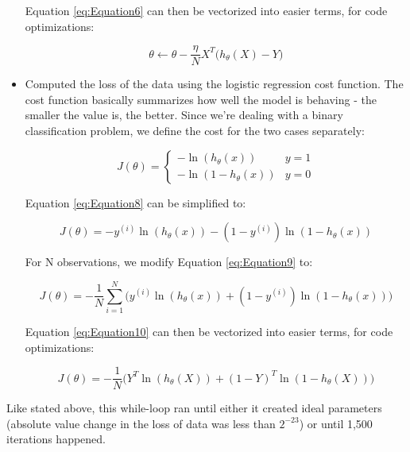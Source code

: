 \begin{itemize}
    Equation \eqref{eq:Equation6} can then be vectorized into easier terms, for code optimizations:

    \begin{equation}
        \label{eq:Equation7}
        \theta \leftarrow \theta - \dfrac{\eta}{N}X^{T}\Big(h_{\theta}(X) - Y\Big)
    \end{equation}

    \item Computed the loss of the data using the logistic regression cost function. The cost function basically summarizes how well the model is behaving - the smaller the value is, the better. Since we’re dealing with a binary classification problem, we define the cost for the two cases separately:

    \begin{equation}
        \label{eq:Equation8}
        J(\theta) =
        \begin{cases}
            -\ln(h_{\theta}(x)) & y = 1\\
            -\ln(1 - h_{\theta}(x)) & y = 0
        \end{cases}
    \end{equation}

    Equation \eqref{eq:Equation8} can be simplified to:

    \begin{equation}
        \label{eq:Equation9}
        J(\theta) = -y^{(i)}\ln(h_{\theta}(x)) - (1 - y^{(i)})\ln(1 - h_{\theta}(x))
    \end{equation}

    For N observations, we modify Equation \eqref{eq:Equation9} to:

    \begin{equation}
        \label{eq:Equation10}
        J(\theta) = -\dfrac{1}{N} \sum_{i = 1}^{N} \Big(y^{(i)}\ln(h_{\theta}(x)) + (1 - y^{(i)})\ln(1 - h_{\theta}(x))\Big)
    \end{equation}

    Equation \eqref{eq:Equation10} can then be vectorized into easier terms, for code optimizations:

    \begin{equation}
        \label{eq:Equation11}
        J(\theta) = -\dfrac{1}{N} \Big(Y^{T} \ln(h_{\theta}(X)) + (1 - Y)^{T}\ln(1 - h_{\theta}(X))\Big)
    \end{equation}
\end{itemize}

\noindent Like stated above, this while-loop ran until either it created ideal parameters (absolute value change in the loss of data was less than $2^{-23}$) or until 1,500 iterations happened.

